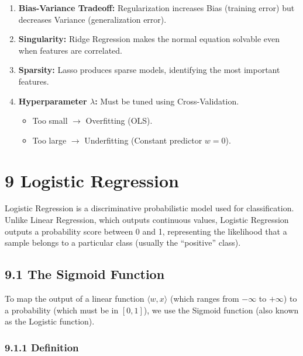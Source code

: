 \documentclass[
  italian,
  11pt,
]{article}
\providecommand{\tightlist}{%
  \setlength{\itemsep}{0pt}\setlength{\parskip}{0pt}}
\begin{document}
\begin{enumerate}
\def\labelenumi{\arabic{enumi}.}
\tightlist
\item
  \textbf{Bias-Variance Tradeoff:} Regularization increases Bias
  (training error) but decreases Variance (generalization error).
\item
  \textbf{Singularity:} Ridge Regression makes the normal equation
  solvable even when features are correlated.
\item
  \textbf{Sparsity:} Lasso produces sparse models, identifying the most
  important features.
\item
  \textbf{Hyperparameter \(\lambda\):} Must be tuned using
  Cross-Validation.

  \begin{itemize}
  \tightlist
  \item
    Too small \(\to\) Overfitting (OLS).
  \item
    Too large \(\to\) Underfitting (Constant predictor \(w=0\)).
  \end{itemize}
\end{enumerate}

\newpage

\section{9 Logistic Regression}\label{logistic-regression}

Logistic Regression is a discriminative probabilistic model used for
classification. Unlike Linear Regression, which outputs continuous
values, Logistic Regression outputs a probability score between 0 and 1,
representing the likelihood that a sample belongs to a particular class
(usually the ``positive'' class).

\subsection{9.1 The Sigmoid Function}\label{the-sigmoid-function}

To map the output of a linear function \(\langle w, x \rangle\) (which
ranges from \(-\infty\) to \(+\infty\)) to a probability (which must be
in \([0, 1]\)), we use the Sigmoid function (also known as the Logistic
function).

\subsubsection{9.1.1 Definition}\label{definition}
\end{document}
